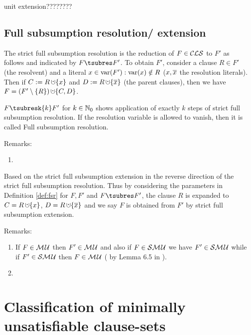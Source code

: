 \documentclass{report}
\begin{document}
\begin{defi}\label{def:unit-ext}
unit extension????????
\end{defi}
\subsection{Full subsumption resolution/ extension}
\label{sec:fsr-e}  
    
\begin{defi}\label{def:fsr}
\cite{h9} The strict full subsumption resolution is the reduction of $F \in \mathcal{CLS}$ to $F'$ as follows and indicated by $F \tsubres F'$. To obtain $F'$, consider a clause $R \in F'$ (the resolvent) and a literal $x \in \operatorname{var}(F'):\operatorname{var}(x) \notin R$ ($x, \overline{x}$ the resolution literals). Then if $C := R \addcup \set{x}$ and $D := R \addcup \set{\ol{x}}$ (the parent clauses), then we have $F = (F' \sm \set{R}) \addcup \set{C,D}$.

$F \tsubresk{k} F'$ for $k \in \mathbb{N}_0$ shows application of exactly $k$ steps of strict full subsumption resolution. If the resolution variable is allowed to vanish, then it is called Full subsumption resolution.
\end{defi}
Remarks:
  \begin{enumerate}
  \item
  \end{enumerate}
    
\begin{defi}\label{def:fse}
Based on \cite{h9} the strict full subsumption extension in the reverse direction of the strict full subsumption resolution. Thus by considering the parameters in Definition \ref{def:fsr} for $F, F'$ and $F \tsubres F'$, the clause $R$ is expanded to $C = R \addcup \set{x}$, $D = R \addcup \set{\ol{x}}$ and we say $F$ is obtained from $F'$ by strict full subsumption extension.
\end{defi}
Remarks:
  \begin{enumerate}
  \item If $F \in \mathcal{M\hspace{0.8pt}U} $ then $ F' \in \mathcal{M\hspace{0.8pt}U}$ and also if $F \in \mathcal{S}\mathcal{M\hspace{0.8pt}U}$ we have $ F' \in \mathcal{S}\mathcal{M\hspace{0.8pt}U}$ while if $ F' \in \mathcal{S}\mathcal{M\hspace{0.8pt}U}$ then $F \in \mathcal{M\hspace{0.8pt}U} $ ( by Lemma 6.5 in \cite{h9}).
  \item 
  \end{enumerate}
    

\section{Classification of minimally unsatisfiable clause-sets}
\label{sec:c-mucls}
\end{document}
